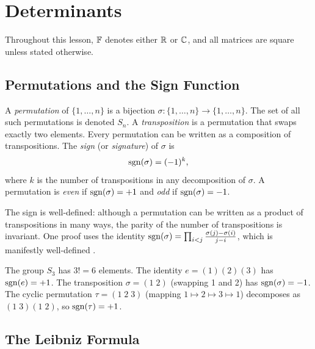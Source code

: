 \documentclass[11pt,a4paper]{article}
\begin{document}
\section{Determinants}
\label{sec:determinants}

Throughout this lesson, $\mathbb{F}$ denotes either $\mathbb{R}$ or $\mathbb{C}$, and all matrices
are square unless stated otherwise.

\subsection{Permutations and the Sign Function}

\begin{definition}
\label{def:permutation}
A \emph{permutation} of $\{1, \ldots, n\}$ is a bijection
$\sigma\colon \{1, \ldots, n\} \to \{1, \ldots, n\}$.  The set of all
such permutations is denoted $S_n$.  A \emph{transposition} is a
permutation that swaps exactly two elements.  Every permutation can be
written as a composition of transpositions.  The \emph{sign} (or
\emph{signature}) of $\sigma$ is
\[
  \operatorname{sgn}(\sigma) = (-1)^{k},
\]
where $k$ is the number of transpositions in any decomposition of $\sigma$.
A permutation is \emph{even} if $\operatorname{sgn}(\sigma) = +1$ and \emph{odd} if
$\operatorname{sgn}(\sigma) = -1$.
\end{definition}

\begin{remark}
\label{rem:sign_well_defined}
The sign is well-defined: although a permutation can be written as a
product of transpositions in many ways, the parity of the number of
transpositions is invariant.  One proof uses the identity
$\operatorname{sgn}(\sigma) = \prod_{i < j} \frac{\sigma(j) - \sigma(i)}{j - i}$,
which is manifestly well-defined \citep[Chapter~5]{hoffman1971}.
\end{remark}

\begin{example}[Permutations of $\{1,2,3\}$]
\label{ex:S3}
The group $S_3$ has $3! = 6$ elements.  The identity $e = (1)(2)(3)$
has $\operatorname{sgn}(e) = +1$.  The transposition $\sigma = (1\;2)$ (swapping 1 and 2)
has $\operatorname{sgn}(\sigma) = -1$.  The cyclic permutation $\tau = (1\;2\;3)$
(mapping $1 \mapsto 2 \mapsto 3 \mapsto 1$) decomposes as
$(1\;3)(1\;2)$, so $\operatorname{sgn}(\tau) = +1$.
\end{example}

\subsection{The Leibniz Formula}
\end{document}
